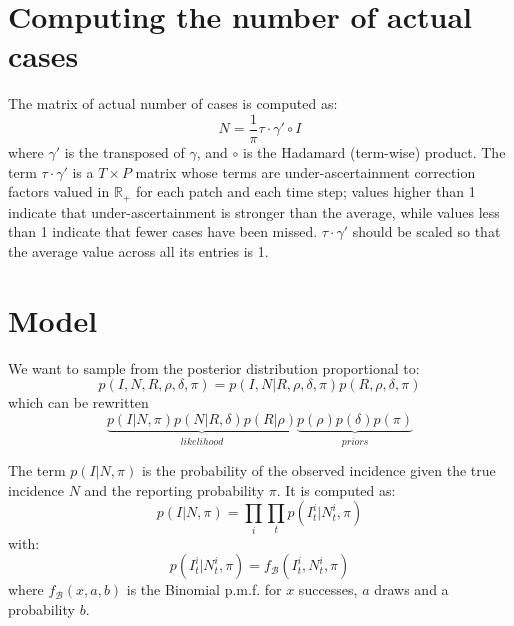 \documentclass[a4paper,11pt]{article}
\newcommand{\R}{\mathbb{R}}
\begin{document}
\newpage
\section{Computing the number of actual cases}

The matrix of actual number of cases is computed as:
\begin{equation}
N = \frac{1}{\pi} \tau \cdot \gamma' \circ I
\end{equation}
where $\gamma'$ is the transposed of $\gamma$, and $\circ$ is the Hadamard (term-wise) product.
The term $\tau \cdot \gamma'$ is a $T \times P$ matrix whose terms are under-ascertainment correction factors valued in $\R_+$ for each patch and each time step; values higher than 1 indicate that under-ascertainment is stronger than the average, while values less than 1 indicate that fewer cases have been missed.
$\tau \cdot \gamma'$ should be scaled so that the average value across all its entries is 1.


\section{Model}

We want to sample from the posterior distribution proportional to:
\begin{equation}
 p(I, N, R, \rho, \delta, \pi) = p(I, N | R, \rho, \delta, \pi)  
 p(R, \rho, \delta, \pi)
\end{equation}
which can be rewritten
\begin{equation}
\underbrace{p(I | N, \pi) p(N | R, \delta) p(R | \rho) }_{likelihood} 
\underbrace{p(\rho) p(\delta) p(\pi)}_{priors} 
\end{equation}

The term $p(I | N, \pi)$ is the probability of the observed incidence given the 
true incidence $N$ and the reporting probability $\pi$.
It is computed as:
\begin{equation}
p(I | N, \pi) = \prod_{i}\prod_{t} p(I_t^i| N_t^i, \pi)
\end{equation}
with:
\begin{equation}
p(I_t^i| N_t^i, \pi) = f_\mathcal{B}(I_t^i, N_t^i, \pi)
\end{equation}
where $f_\mathcal{B}(x,a,b)$ is the Binomial p.m.f. for $x$ successes, $a$ draws 
and a probability $b$.
\\
\end{document}
